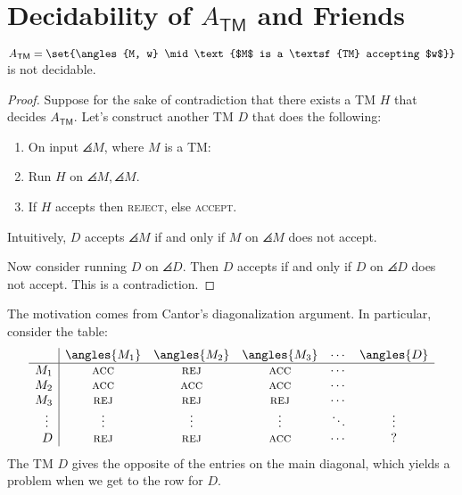 \documentclass{standalone}
\begin{document}
\section{Decidability of \texorpdfstring{\(A_{\textsf{TM}}\)}{A\_TM} and Friends}
\begin{theorem}
	\(A_{\textsf{TM}} = \set{\angles{M, w} \mid \text{$M$ is a \textsf{TM} accepting $w$}}\) is not decidable.
\end{theorem}
\begin{proof}
	Suppose for the sake of contradiction that there exists a \textsf{TM} \(H\) that decides \(A_{\textsf{TM}}\). Let's construct another \textsf{TM} \(D\) that does the following:
	\begin{enumerate}[start=0]
		\item On input \(\angles{M}\), where \(M\) is a \textsf{TM}:
		\item Run \(H\) on \(\angles{M, \angles{M}}\).
		\item If \(H\) accepts then \textsc{reject}, else \textsc{accept}.
	\end{enumerate}
	
	Intuitively, \(D\) accepts \(\angles{M}\) if and only if \(M\) on \(\angles M\) does not accept.

	Now consider running \(D\) on \(\angles{D}\). Then \(D\) accepts if and only if \(D\) on \(\angles{D}\) does not accept. This is a contradiction.
\end{proof}

The motivation comes from Cantor's diagonalization argument. In particular, consider the table:
\[
	\begin{array}{r | c c c c c} %
		    & \angles{M_1} & \angles{M_2} & \angles{M_3} & \cdots & \angles{D} \\ \hline %
		M_1 & \textsc{acc} & \textsc{rej} & \textsc{acc} & \cdots & \\
		M_2 & \textsc{acc} & \textsc{acc} & \textsc{acc} & \cdots & \\
		M_3 & \textsc{rej} & \textsc{rej} & \textsc{rej} & \cdots & \\
		\vdots\,\, & \vdots & \vdots & \vdots & \ddots & \vdots \\
		D & \textsc{rej} & \textsc{rej} & \textsc{acc} & \cdots & ? \\
	\end{array}
\]
The \textsf{TM} \(D\) gives the opposite of the entries on the main diagonal, which yields a problem when we get to the row for \(D\).
\end{document}
